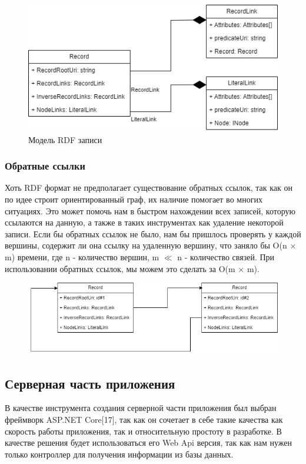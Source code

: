 \documentclass[12pt]{article}
\begin{document}
\begin{figure}[!ht]
    \includegraphics[width=1\textwidth]{_images/record_literal.png}
    \caption{Модель RDF записи}
    \label{fig:record}
\end{figure}

\subsubsection{Обратные ссылки} \label{sect:inv_link}
\qquad Хоть RDF формат не предполагает существование обратных ссылок, так как он по идее строит ориентированный граф, их наличие помогает во многих ситуациях. Это может помочь нам в быстром нахождении всех записей, которую ссылаются на данную, а также в таких инструментах как удаление некоторой записи. Если бы обратных ссылок не было, нам бы пришлось проверять у каждой вершины, содержит ли она ссылку на удаленную вершину, что заняло бы O(n $\times$ m) времени, где n - количество вершин, m $\ll$ n - количество связей. При использовании обратных ссылок, мы можем это сделать за O(m $\times$ m).

\begin{figure}[!b]
    \centering
    \includegraphics[width=1\textwidth]{_images/inverse_link.png}
\end{figure}

\pagebreak

\subsection{Серверная часть приложения}
\qquad В качестве инструмента создания серверной части приложения был выбран фреймворк ASP.NET Core[17], так как он сочетает в себе такие качества как скорость работы приложения, так и относительную простоту в разработке. В качестве решения будет использоваться его Web Api версия, так как нам нужен только контроллер для получения информации из базы данных.
\end{document}
